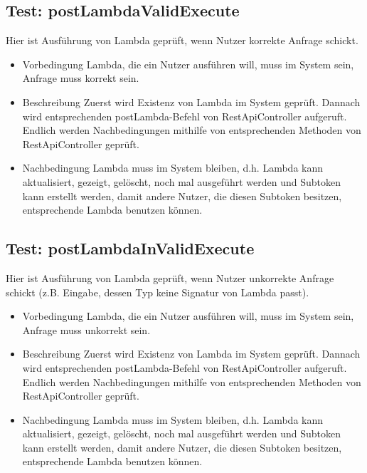 \documentclass[a4paper,20pt,oneside]{book}
\begin{document}
 \subsection{Test: postLambdaValidExecute}
 Hier ist Ausführung von Lambda geprüft, wenn Nutzer korrekte Anfrage schickt.
 \begin{itemize}
 	\item Vorbedingung \linebreak
 	Lambda, die ein Nutzer ausführen will, muss im System sein, Anfrage muss korrekt sein.
 	\item Beschreibung \linebreak
 	Zuerst wird Existenz von Lambda im System geprüft. Dannach wird entsprechenden postLambda-Befehl von RestApiController aufgeruft. Endlich werden Nachbedingungen mithilfe von  entsprechenden Methoden von RestApiController geprüft.
 	\item Nachbedingung \linebreak
 	Lambda muss im System bleiben, d.h. Lambda kann aktualisiert, gezeigt, gelöscht, noch mal ausgeführt werden und Subtoken kann erstellt werden, damit andere Nutzer, die diesen Subtoken besitzen, entsprechende Lambda benutzen können.
 \end{itemize}  
 \subsection{Test: postLambdaInValidExecute}
Hier ist Ausführung von Lambda geprüft, wenn Nutzer unkorrekte Anfrage schickt (z.B. Eingabe, dessen Typ keine Signatur von Lambda passt).
\begin{itemize}
	\item Vorbedingung \linebreak
	Lambda, die ein Nutzer ausführen will, muss im System sein, Anfrage muss unkorrekt sein.
	\item Beschreibung \linebreak
	Zuerst wird Existenz von Lambda im System geprüft. Dannach wird entsprechenden postLambda-Befehl von RestApiController aufgeruft. Endlich werden Nachbedingungen mithilfe von  entsprechenden Methoden von RestApiController geprüft.
	\item Nachbedingung \linebreak
	Lambda muss im System bleiben, d.h. Lambda kann aktualisiert, gezeigt, gelöscht, noch mal ausgeführt werden und Subtoken kann erstellt werden, damit andere Nutzer, die diesen Subtoken besitzen, entsprechende Lambda benutzen können.
\end{itemize}  
 
\end{document}

